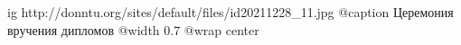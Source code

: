 
 
 
 
 

\ifcmt
  ig http://donntu.org/sites/default/files/id20211228_11.jpg
	@caption Церемония вручения дипломов
  @width 0.7
	@wrap center
\fi
